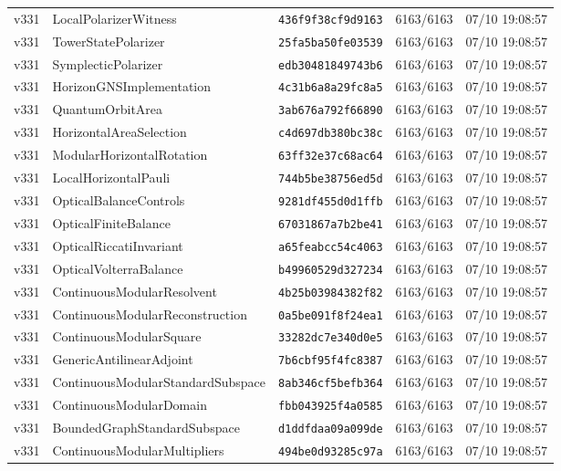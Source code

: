 \documentclass[11pt]{article}
\theoremstyle{definition}\newtheorem{deriv}{Derivação}
\begin{document}
{\begin{longtable}{@{}lllll@{}}
v331 & LocalPolarizerWitness & \texttt{436f9f38cf9d9163} & 6163/6163 & 07/10 19:08:57 \\
v331 & TowerStatePolarizer & \texttt{25fa5ba50fe03539} & 6163/6163 & 07/10 19:08:57 \\
v331 & SymplecticPolarizer & \texttt{edb30481849743b6} & 6163/6163 & 07/10 19:08:57 \\
v331 & HorizonGNSImplementation & \texttt{4c31b6a8a29fc8a5} & 6163/6163 & 07/10 19:08:57 \\
v331 & QuantumOrbitArea & \texttt{3ab676a792f66890} & 6163/6163 & 07/10 19:08:57 \\
v331 & HorizontalAreaSelection & \texttt{c4d697db380bc38c} & 6163/6163 & 07/10 19:08:57 \\
v331 & ModularHorizontalRotation & \texttt{63ff32e37c68ac64} & 6163/6163 & 07/10 19:08:57 \\
v331 & LocalHorizontalPauli & \texttt{744b5be38756ed5d} & 6163/6163 & 07/10 19:08:57 \\
v331 & OpticalBalanceControls & \texttt{9281df455d0d1ffb} & 6163/6163 & 07/10 19:08:57 \\
v331 & OpticalFiniteBalance & \texttt{67031867a7b2be41} & 6163/6163 & 07/10 19:08:57 \\
v331 & OpticalRiccatiInvariant & \texttt{a65feabcc54c4063} & 6163/6163 & 07/10 19:08:57 \\
v331 & OpticalVolterraBalance & \texttt{b49960529d327234} & 6163/6163 & 07/10 19:08:57 \\
v331 & ContinuousModularResolvent & \texttt{4b25b03984382f82} & 6163/6163 & 07/10 19:08:57 \\
v331 & ContinuousModularReconstruction & \texttt{0a5be091f8f24ea1} & 6163/6163 & 07/10 19:08:57 \\
v331 & ContinuousModularSquare & \texttt{33282dc7e340d0e5} & 6163/6163 & 07/10 19:08:57 \\
v331 & GenericAntilinearAdjoint & \texttt{7b6cbf95f4fc8387} & 6163/6163 & 07/10 19:08:57 \\
v331 & ContinuousModularStandardSubspace & \texttt{8ab346cf5befb364} & 6163/6163 & 07/10 19:08:57 \\
v331 & ContinuousModularDomain & \texttt{fbb043925f4a0585} & 6163/6163 & 07/10 19:08:57 \\
v331 & BoundedGraphStandardSubspace & \texttt{d1ddfdaa09a099de} & 6163/6163 & 07/10 19:08:57 \\
v331 & ContinuousModularMultipliers & \texttt{494be0d93285c97a} & 6163/6163 & 07/10 19:08:57 \\

\end{longtable}}
\end{document}
